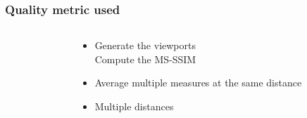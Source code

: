 \begin{frame}[c]
   \frametitle{Quality metric used}

   \begin{columns}[T]

     \begin{column}{0.6\linewidth}
        \begin{independentCounter}
        \end{independentCounter}
     \end{column}
     \begin{column}{0.4\linewidth}
        \begin{itemize}
           \item<1-> Generate the viewports\\ Compute the MS-SSIM
           \item<2-> Average multiple measures at the same distance
           \item<5-> Multiple distances
        \end{itemize}
     \end{column}
  \end{columns}

\end{frame}

